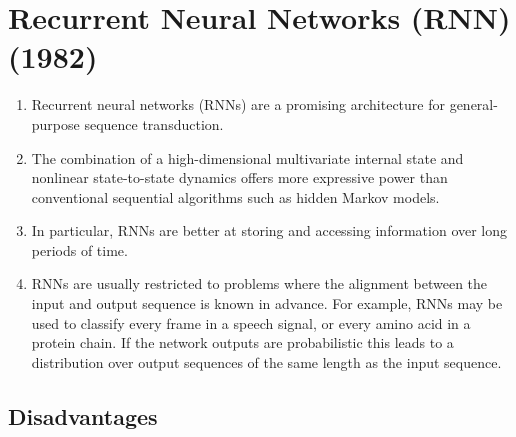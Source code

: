 \chapter{Recurrent Neural Networks (RNN) (1982)}

\begin{enumerate}
    \item Recurrent neural networks (RNNs) are a promising architecture for general-purpose sequence transduction.
    \hfill \cite{arxiv/1211.3711/Sequence-Transduction-RNN}

    \item The combination of a high-dimensional multivariate internal state and nonlinear state-to-state dynamics offers more expressive power than conventional sequential algorithms such as hidden Markov models.
    \hfill \cite{arxiv/1211.3711/Sequence-Transduction-RNN}

    \item In particular, RNNs are better at storing and accessing information over long periods of time.
    \hfill \cite{arxiv/1211.3711/Sequence-Transduction-RNN}

    \item RNNs are usually restricted to problems where the alignment between the input and output sequence is known in advance.
    For example, RNNs may be used to classify every frame in a speech signal, or every amino acid in a protein chain. 
    If the network outputs are probabilistic this leads to a distribution over output sequences of the same length as the input sequence. 
    \hfill \cite{arxiv/1211.3711/Sequence-Transduction-RNN}
\end{enumerate}

\section{Disadvantages}

